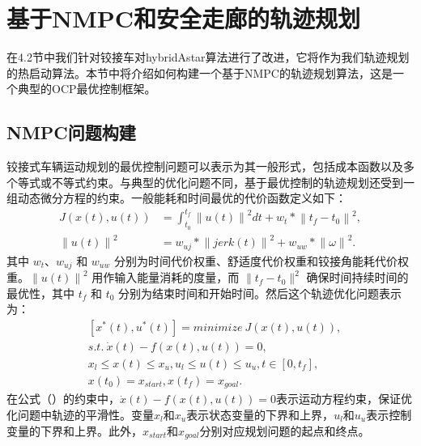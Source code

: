 \documentclass[master,academic]{ysuthesis} %
\begin{document}
	\section{基于NMPC和安全走廊的轨迹规划}
	在4.2节中我们针对铰接车对hybridAstar算法进行了改进，它将作为我们轨迹规划的热启动算法。本节中将介绍如何构建一个基于NMPC的轨迹规划算法，这是一个典型的OCP最优控制框架。
		\subsection{NMPC问题构建}
		铰接式车辆运动规划的最优控制问题可以表示为其一般形式，包括成本函数以及多个等式或不等式约束。与典型的优化问题不同，基于最优控制的轨迹规划还受到一组动态微分方程的约束。一般能耗和时间最优的代价函数定义如下：
		\begin{equation}
			\begin{aligned}
				J(x(t),u(t)) &= \int_{t_0}^{t_f}
				\left\| u(t)\right\|^2dt +w_t*\left\|t_f-t_0\right\|^2,    \\
				\left\|u(t)\right\|^2&=w_{uj}*\left\|jerk(t)\right\|^2+w_{uw}*\left\|\omega\right\|^2.
			\end{aligned} 
		\end{equation}
		其中 $w_t$、$w_{uj}$ 和 $w_{uw}$ 分别为时间代价权重、舒适度代价权重和铰接角能耗代价权重。$\left\|u(t)\right\|^2$ 用作输入能量消耗的度量，而 $\|t_f- t_0\|^2$ 确保时间持续时间的最优性，其中 $t_f$ 和 $t_0$ 分别为结束时间和开始时间。然后这个轨迹优化问题表示为：
		\begin{equation}
			\begin{aligned}
				&\left[x^*(t),u^*(t)\right] = minimize\ J(x(t),u(t)),\\      
				&s.t.\ \dot x(t)-f(x(t),u(t))=0,\\
				&x_l \leq x(t) \leq x_u, u_l \leq u(t) \leq u_u,t\in \left[0,t_f\right],\\
				&x(t_0)=x_{start},x(t_f)=x_{goal}.\label{4}
			\end{aligned}   
		\end{equation}
		在公式（）的约束中，$\dot x(t)-f(x(t),u(t))=0$表示运动方程约束，保证优化问题中轨迹的平滑性。变量$x_l$和$x_u$表示状态变量的下界和上界，$u_l$和$u_u$表示控制变量的下界和上界。此外，$x_{start}$和$x_{goal}$分别对应规划问题的起点和终点。
\end{document}
